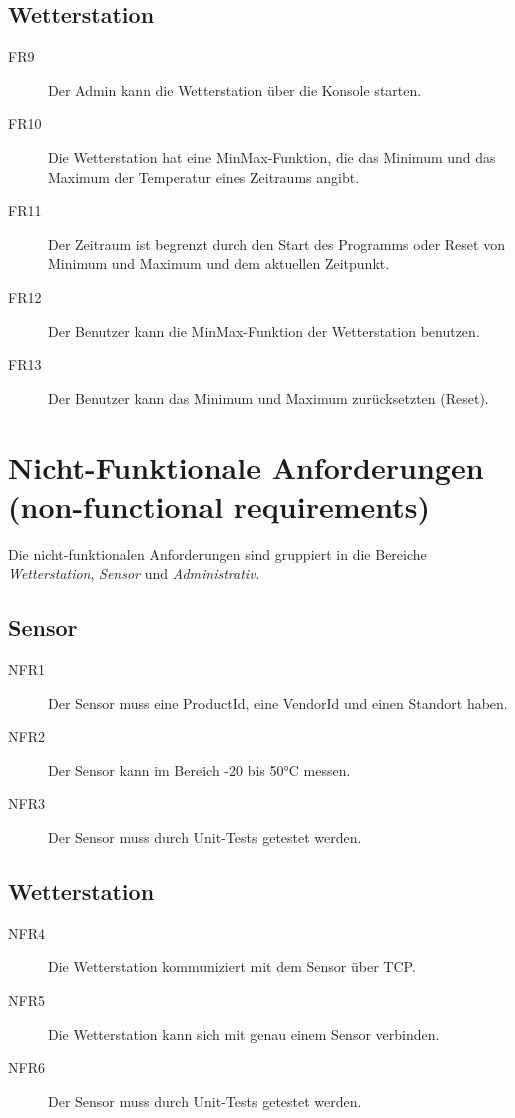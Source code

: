 \documentclass[a4paper]{report}
\begin{document}
\subsection{Wetterstation}
\begin{description}
    \item[FR9] Der Admin kann die Wetterstation über die Konsole starten.
    \item[FR10] Die Wetterstation hat eine MinMax-Funktion, die das Minimum und das Maximum der Temperatur eines Zeitraums angibt.
    \item[FR11] Der Zeitraum ist begrenzt durch den Start des Programms oder Reset von Minimum und Maximum und dem aktuellen Zeitpunkt.
    \item[FR12] Der Benutzer kann die MinMax-Funktion der Wetterstation benutzen.
    \item[FR13] Der Benutzer kann das Minimum und Maximum zurücksetzten (Reset). 
\end{description}


\section{Nicht-Funktionale Anforderungen (non-functional requirements)}
Die nicht-funktionalen Anforderungen sind gruppiert in die Bereiche \textit{Wetterstation}, \textit{Sensor} und \textit{Administrativ}.
\subsection{Sensor}
\begin{description}
    \item[NFR1] Der Sensor muss eine ProductId, eine VendorId und einen Standort haben.
    \item[NFR2] Der Sensor kann im Bereich -20 bis 50°C  messen.
    \item[NFR3] Der Sensor muss durch Unit-Tests getestet werden.
\end{description}

\subsection{Wetterstation}
\begin{description}
    \item[NFR4] Die Wetterstation kommuniziert mit dem Sensor über TCP.
    \item[NFR5] Die Wetterstation kann sich mit genau einem Sensor verbinden.
    \item[NFR6] Der Sensor muss durch Unit-Tests getestet werden.
\end{description}
\end{document}
